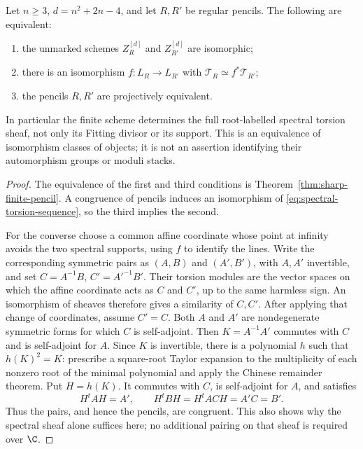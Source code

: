 \begin{theorem}
\label{thm:spectral-finite-torelli}
Let \(n\ge3\), \(d=n^2+2n-4\), and let \(R,R'\) be
regular pencils.  The following are equivalent:
\begin{enumerate}
\item the unmarked schemes \(Z_R^{[d]}\) and \(Z_{R'}^{[d]}\)
are isomorphic;
\item there is an isomorphism \(f:L_R\to L_{R'}\) with
\(\mathcal T_R\simeq f^*\mathcal T_{R'}\);
\item the pencils \(R,R'\) are projectively equivalent.
\end{enumerate}
In particular the finite scheme determines the full root-labelled
spectral torsion sheaf, not only its Fitting divisor or its support.
This is an equivalence of isomorphism classes of objects; it is not
an assertion identifying their automorphism groups or moduli stacks.
\end{theorem}
\begin{proof}
The equivalence of the first and third conditions is
Theorem~\ref{thm:sharp-finite-pencil}.  A congruence of pencils
induces an isomorphism of \eqref{eq:spectral-torsion-sequence},
so the third implies the second.

For the converse choose a common affine coordinate whose point at
infinity avoids the two spectral supports, using \(f\) to identify
the lines.  Write the corresponding symmetric pairs as \((A,B)\)
and \((A',B')\), with \(A,A'\) invertible, and set
\(C=A^{-1}B\), \(C'=A'^{-1}B'\).  Their torsion modules
are the vector spaces on which the affine coordinate acts as \(C\)
and \(C'\), up to the same harmless sign.  An isomorphism of
sheaves therefore gives a similarity of \(C,C'\).  After applying
that change of coordinates, assume \(C'=C\).  Both \(A\) and
\(A'\) are nondegenerate symmetric forms for which \(C\) is
self-adjoint.  Then \(K=A^{-1}A'\) commutes with \(C\)
and is self-adjoint for \(A\).  Since \(K\) is invertible,
there is a polynomial \(h\) such that \(h(K)^2=K\): prescribe
a square-root Taylor expansion to the multiplicity of each nonzero
root of the minimal polynomial and apply the Chinese remainder
theorem.  Put \(H=h(K)\).  It commutes with \(C\), is
self-adjoint for \(A\), and satisfies
\[
 H^tAH=A',\qquad H^tBH=H^tACH=A'C=B'.
\]
Thus the pairs, and hence the pencils, are congruent.  This also shows
why the spectral sheaf alone suffices here; no additional pairing on
that sheaf is required over \(\C\).
\end{proof}

